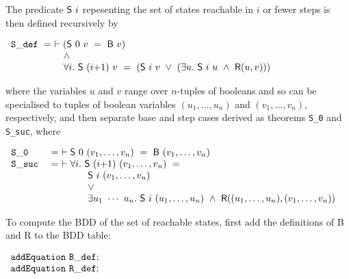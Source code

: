 \documentclass[12pt]{article}
\newcommand{\con}[1]{\mbox{\sf #1}}
\newcommand{\ml}[1]{{\tt #1}}
\begin{document}
\smallskip
The predicate $\con{S}~i$ repesenting the set of states reachable in
$i$ or fewer steps is then defined recursively by

\smallskip

$\begin{array}{l}
\ml{S\_def}~=~\vdash (\con{S}~0~v~=~\con{B}~v)\\
\phantom{\ml{S\_def}~=~\vdash }
 ~\wedge\\
\phantom{\ml{S\_def}~=~\vdash }
~\forall i.~\con{S}~(i{+}1)~v~ =~(\con{S}~i~v~\vee~(\exists u.~\con{S}~i~u~\wedge~\con{R}(u,v)))\\
\end{array}$

\smallskip

\noindent where the variables $u$ and $v$ range over $n$-tuples of booleans and
so can be specialised to tuples of boolean variables $(u_1,\ldots,u_n)$ and
$(v_1,\ldots,v_n)$, respectively, and then separate
base and step cases derived as theorems \ml{S\_0} and \ml{S\_suc}, where

\smallskip

$\begin{array}{ll}
\ml{S\_0}~&=~\vdash \con{S}~0~(v_1,\ldots,v_n)~=~\con{B}~(v_1,\ldots,v_n)\\

\ml{S\_suc}~&=~\vdash \forall i.~\con{S}~(i{+}1)~(v_1,\ldots,v_n)~ =\\
& \phantom{=~\vdash \forall i.~~}
\con{S}~i~(v_1,\ldots,v_n)\\
& \phantom{=~\vdash \forall i.~~}
\vee\\
& \phantom{=~\vdash \forall i.~~}
\exists u_1~\cdots~u_n.~\con{S}~i~(u_1,\ldots,u_n)~\wedge~\con{R}((u_1,\ldots,u_n),(v_1,\ldots,v_n))
\end{array}$

\smallskip


To compute the
BDD of the set of reachable states, first add the definitions of \con{B} and \con{R}
to the BDD table:


\smallskip

$\begin{array}{ll}
\ml{addEquation~B\_def};\\
\ml{addEquation~R\_def};
\end{array}$

\smallskip
\end{document}
